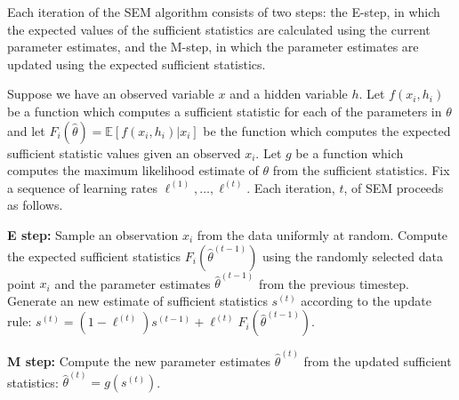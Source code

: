 \documentclass[aps,pre,reprint,superscriptaddress,nofootinbib]{revtex4-2}
\begin{document}
Each iteration of the SEM algorithm consists of two steps: the E-step, in which the expected values of the sufficient statistics are calculated using the current parameter estimates, and the M-step, in which the parameter estimates are updated using the expected sufficient statistics. 

Suppose we have an observed variable $x$ and a hidden variable $h$. Let $f(x_i, h_i)$ be a function which computes a sufficient statistic for each of the parameters in $\theta$ and let $F_i(\hat{\theta}) = \mathbb{E}[f(x_i, h_i) | x_i]$ be the function which computes the expected sufficient statistic values given an observed $x_i$. Let $g$ be a function which computes the maximum likelihood estimate of $\theta$ from the sufficient statistics. Fix a sequence of learning rates $\ell^{(1)}, \ldots, \ell^{(t)}$. Each iteration, $t$, of SEM proceeds as follows.
    
\textbf{E step:} Sample an observation $x_i$ from the data uniformly at random. Compute the expected sufficient statistics $F_i(\hat{\theta}^{(t - 1)})$ using the randomly selected data point $x_i$ and the parameter estimates $\hat{\theta}^{(t - 1)}$ from the previous timestep. Generate an new estimate of sufficient statistics $s^{(t)}$ according to the update rule: $s^{(t)} = (1 - \ell^{(t)}) s^{(t - 1)} + \ell^{(t)}F_i(\hat{\theta}^{(t - 1)})$.
    
\textbf{M step:} Compute the new parameter estimates $\hat{\theta}^{(t)}$ from the updated sufficient statistics:
$\hat{\theta}^{(t)} = g(s^{(t)})$.
    
\end{document}
